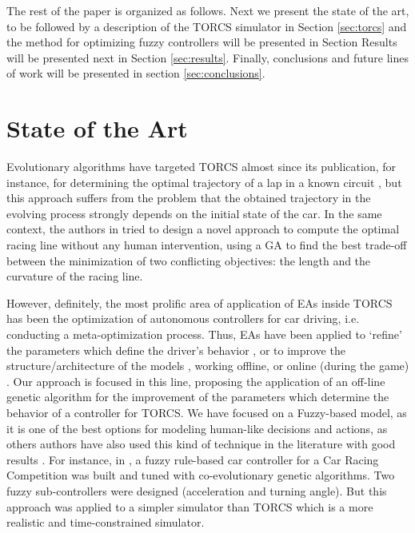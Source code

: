 \documentclass[conference]{IEEEtran}
\begin{document}
The rest of the paper is organized as follows. Next we present the
state of the art, to be followed by a description of the TORCS
simulator in Section \ref{sec:torcs} and the
method for optimizing fuzzy controllers will be presented in Section
Results will be presented next in Section \ref{sec:results}. Finally, conclusions and future lines of work will
be presented in section \ref{sec:conclusions}.


\section{State of the Art}
\label{sec:soa}

Evolutionary algorithms have targeted TORCS almost since its
publication, for instance, for determining the
optimal trajectory of a lap in a known circuit \cite{drivingGA2008},
but this approach suffers from the problem that the obtained
trajectory in the evolving process strongly depends on the initial
state of the car.  
In the same context, the authors in \cite{GaRaceLine2010} tried to design a novel approach to compute the optimal racing line without any human intervention, using a GA to find the best trade-off between
the minimization of two conflicting objectives: the length and
the curvature of the racing line.

However, definitely, the most prolific area of application of EAs
inside TORCS has been the optimization of autonomous controllers for
car driving, i.e. conducting a meta-optimization process. 
Thus, EAs have been applied to `refine' the parameters which define
the driver's behavior \cite{ButzCMAES09,SAES2012}, or to improve the
structure/architecture of the models \cite{evol,neurone}, working
offline, or online (during the game)
\cite{TanOnline08,Cardamone_Online_NN}.
Our approach is focused in this line, proposing the application of an off-line genetic algorithm for the improvement of the parameters which determine the behavior of a controller for TORCS. We have focused on a Fuzzy-based model, as it is one of the best options for modeling human-like decisions and actions, as others authors have also used this kind of technique in the literature with good results \cite{torcs2012}. 
For instance, in \cite{Guadarrama2008}, a fuzzy rule-based car controller for a Car Racing Competition was built and tuned with co-evolutionary genetic algorithms. Two fuzzy sub-controllers were designed (acceleration and turning angle). %
But this approach was applied to a simpler simulator than TORCS which is a more realistic and time-constrained simulator. 
\end{document}
